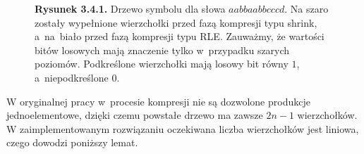 \documentclass[declaration,shortabstract]{iithesis}
\theoremstyle{definition} \newtheorem{definition}{Definicja}[chapter]
\theoremstyle{plain} \newtheorem{remark}[definition]{Obserwacja}
\theoremstyle{plain} \newtheorem{theorem}[definition]{Twierdzenie}
\theoremstyle{plain} \newtheorem{example}{Przykład}[definition]
\theoremstyle{plain} \newtheorem{lemma}[definition]{Lemat}
\begin{document}
\begin{figure}[h]
    \begin{center}
        \caption*{\textbf{Rysunek 3.4.1.} Drzewo symbolu dla słowa $aabbaabbcccd$. Na szaro zostały wypełnione wierzchołki przed fazą kompresji typu shrink, a~na~biało przed fazą kompresji typu RLE. Zauważmy, że wartości bitów losowych mają znaczenie tylko w~przypadku szarych poziomów. Podkreślone wierzchołki mają losowy bit równy $1$, a~niepodkreślone $0$.}
    \end{center}
\end{figure}

W oryginalnej pracy w~procesie kompresji nie są dozwolone produkcje jednoelementowe, dzięki czemu powstałe drzewo ma zawsze $2n-1$ wierzchołków. W zaimplementowanym rozwiązaniu oczekiwana liczba wierzchołków jest liniowa, czego dowodzi poniższy lemat.
\end{document}
